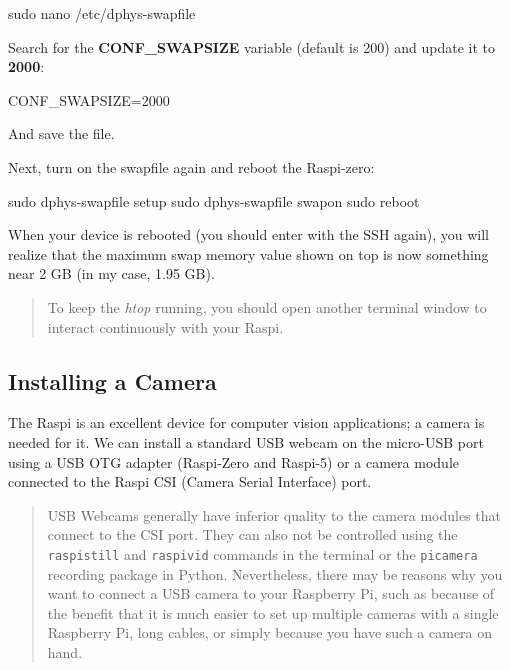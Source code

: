 \documentclass[
]{article}
\newenvironment{Shaded}{\begin{snugshade}}{\end{snugshade}}
\newcommand{\FunctionTok}[1]{\textcolor[rgb]{0.28,0.35,0.67}{#1}}
\newcommand{\NormalTok}[1]{\textcolor[rgb]{0.00,0.23,0.31}{#1}}
\newcommand{\OperatorTok}[1]{\textcolor[rgb]{0.37,0.37,0.37}{#1}}
\newcommand{\VariableTok}[1]{\textcolor[rgb]{0.07,0.07,0.07}{#1}}
\begin{document}
\begin{Shaded}
\begin{Highlighting}[]
\FunctionTok{sudo}\NormalTok{ nano /etc/dphys{-}swapfile}
\end{Highlighting}
\end{Shaded}

Search for the \textbf{CONF\_SWAPSIZE} variable (default is 200) and
update it to \textbf{2000}:

\begin{Shaded}
\begin{Highlighting}[]
\VariableTok{CONF\_SWAPSIZE}\OperatorTok{=}\NormalTok{2000}
\end{Highlighting}
\end{Shaded}

And save the file.

Next, turn on the swapfile again and reboot the Raspi-zero:

\begin{Shaded}
\begin{Highlighting}[]
\FunctionTok{sudo}\NormalTok{ dphys{-}swapfile setup}
\FunctionTok{sudo}\NormalTok{ dphys{-}swapfile swapon}
\FunctionTok{sudo}\NormalTok{ reboot}
\end{Highlighting}
\end{Shaded}

When your device is rebooted (you should enter with the SSH again), you
will realize that the maximum swap memory value shown on top is now
something near 2 GB (in my case, 1.95 GB).

\begin{quote}
To keep the \emph{htop} running, you should open another terminal window
to interact continuously with your Raspi.
\end{quote}

\subsection{Installing a Camera}\label{sec-setup-installing-camera-403e}

The Raspi is an excellent device for computer vision applications; a
camera is needed for it. We can install a standard USB webcam on the
micro-USB port using a USB OTG adapter (Raspi-Zero and Raspi-5) or a
camera module connected to the Raspi CSI (Camera Serial Interface) port.

\begin{quote}
USB Webcams generally have inferior quality to the camera modules that
connect to the CSI port. They can also not be controlled using the
\texttt{raspistill} and \texttt{raspivid} commands in the terminal or
the \texttt{picamera} recording package in Python. Nevertheless, there
may be reasons why you want to connect a USB camera to your Raspberry
Pi, such as because of the benefit that it is much easier to set up
multiple cameras with a single Raspberry Pi, long cables, or simply
because you have such a camera on hand.
\end{quote}
\end{document}

